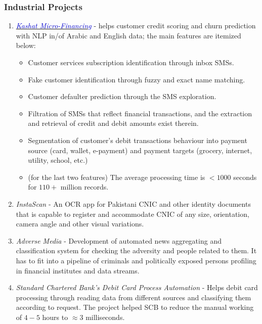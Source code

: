 \documentclass[a4paper, 10pt]{article}
\begin{document}
\subsubsection*{Industrial Projects}
\begin{enumerate}
\itemsep = 0em
\item \emph{ \href{https://kashat.com.eg/en/}{\textcolor{MediumBlue}{Kashat Micro-Financing}}} - helps {customer credit scoring} and {churn prediction} with NLP in/of {Arabic}
and {English} data; the main features are itemized below:
\begin{itemize}
\itemsep = 0em

\item Customer {services subscription identification} through inbox SMSs.

\item {Fake customer identification} through fuzzy and exact name matching.

\item {Customer defaulter prediction} through the SMS exploration.

\item Filtration of SMSs that reflect financial transactions, and the {extraction and retrieval of credit and debit amounts} exist therein.

\item Segmentation of {customer's debit transactions behaviour into payment source} (card, wallet, e-payment) and {payment targets} (grocery, internet, utility, school, etc.)

\item (for the last two features) The average processing time is $<\!1000$ seconds for $110+$ million records.
\end{itemize}

\item \emph{ InstaScan} - An OCR app for Pakistani CNIC and other identity documents that is capable to register and accommodate CNIC of any size, orientation, camera angle and other visual variations.

\item \emph{ Adverse Media} - Development of automated news aggregating and classification system for checking the adversity and people related to them. It has to fit into a pipeline of criminals and politically exposed persons profiling in financial institutes and data streams.

\item \emph{ Standard Chartered Bank's Debit Card Process Automation} - Helps debit card processing through reading data from different sources and classifying them according to request. The project helped SCB to reduce the manual working of $4\!-\!5$ hours to $\approx\!3$ milliseconds.


\end{enumerate}
\end{document}

